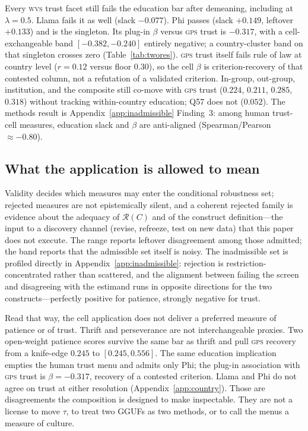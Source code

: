 \documentclass[10pt,letterpaper]{article}
\newcommand{\GPS}{\textsc{gps}}
\newcommand{\WVS}{\textsc{wvs}}
\newcommand{\Rset}{\mathcal{R}}
\begin{document}
Every \WVS{} trust facet still fails the education bar after demeaning, including at $\lambda=0.5$.
Llama fails it as well (slack $-0.077$).
Phi passes (slack $+0.149$, leftover $+0.133$) and is the singleton.
Its plug-in $\beta$ versus \GPS{} trust is $-0.317$, with a cell-exchangeable band $[-0.382,-0.240]$ entirely negative; a country-cluster band on that singleton crosses zero (Table~\ref{tab:twores}).
\GPS{} trust itself fails rule of law at country level ($r=0.12$ versus floor $0.30$), so the cell $\beta$ is criterion-recovery of that contested column, not a refutation of a validated criterion.
In-group, out-group, institution, and the composite still co-move with \GPS{} trust ($0.224$, $0.211$, $0.285$, $0.318$) without tracking within-country education; Q57 does not ($0.052$).
The methods result is Appendix~\ref{app:inadmissible} Finding~3: among human trust-cell measures, education slack and $\beta$ are anti-aligned (Spearman/Pearson $\approx-0.80$).

\subsection{What the application is allowed to mean}
\label{sec:app-read}

Validity decides which measures may enter the conditional robustness set; rejected measures are not epistemically silent, and a coherent rejected family is evidence about the adequacy of $\Rset(C)$ and of the construct definition---the input to a discovery channel (revise, refreeze, test on new data) that this paper does not execute.
The range reports leftover disagreement among those admitted; the band reports that the admissible set itself is noisy.
The inadmissible set is profiled directly in Appendix~\ref{app:inadmissible}: rejection is restriction-concentrated rather than scattered, and the alignment between failing the screen and disagreeing with the estimand runs in opposite directions for the two constructs---perfectly positive for patience, strongly negative for trust.

Read that way, the cell application does not deliver a preferred measure of patience or of trust.
Thrift and perseverance are not interchangeable proxies.
Two open-weight patience scores survive the same bar as thrift and pull \GPS{} recovery from a knife-edge $0.245$ to $[0.245,0.556]$.
The same education implication empties the human trust menu and admits only Phi; the plug-in association with \GPS{} trust is $\beta=-0.317$, recovery of a contested criterion.
Llama and Phi do not agree on trust at either resolution (Appendix~\ref{app:country}).
Those are disagreements the composition is designed to make inspectable.
They are not a license to move $\tau$, to treat two GGUFs as two methods, or to call the menus a measure of culture.
\end{document}
